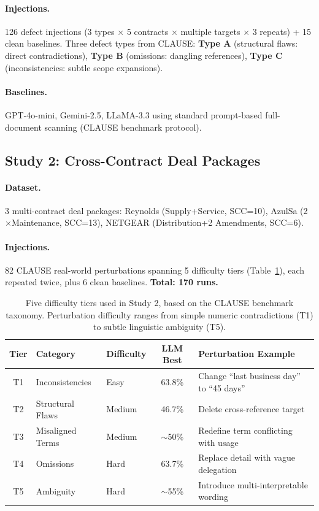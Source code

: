 \documentclass{article}
\begin{document}
\paragraph{Injections.} 126 defect injections (3 types $\times$ 5 contracts $\times$ multiple targets $\times$ 3 repeats) + 15 clean baselines. Three defect types from CLAUSE: \textbf{Type A} (structural flaws: direct contradictions), \textbf{Type B} (omissions: dangling references), \textbf{Type C} (inconsistencies: subtle scope expansions).

\paragraph{Baselines.} GPT-4o-mini, Gemini-2.5, LLaMA-3.3 using standard prompt-based full-document scanning (CLAUSE benchmark protocol).

\subsection{Study 2: Cross-Contract Deal Packages}

\paragraph{Dataset.} 3 multi-contract deal packages: Reynolds (Supply+Service, SCC=10), AzulSa (2$\times$Maintenance, SCC=13), NETGEAR (Distribution+2 Amendments, SCC=6).

\paragraph{Injections.} 82 CLAUSE real-world perturbations spanning 5 difficulty tiers (Table~\ref{tab:tiers}), each repeated twice, plus 6 clean baselines. \textbf{Total: 170 runs.}

\begin{table}[t]
\caption{Five difficulty tiers used in Study 2, based on the CLAUSE benchmark taxonomy. Perturbation difficulty ranges from simple numeric contradictions (T1) to subtle linguistic ambiguity (T5).}
\label{tab:tiers}
\centering
\small
\begin{tabular}{cllcl}
\toprule
\textbf{Tier} & \textbf{Category} & \textbf{Difficulty} & \textbf{LLM Best} & \textbf{Perturbation Example} \\
\midrule
T1 & Inconsistencies & Easy & 63.8\% & Change ``last business day'' to ``45 days'' \\
T2 & Structural Flaws & Medium & 46.7\% & Delete cross-reference target \\
T3 & Misaligned Terms & Medium & $\sim$50\% & Redefine term conflicting with usage \\
T4 & Omissions & Hard & 63.7\% & Replace detail with vague delegation \\
T5 & Ambiguity & Hard & $\sim$55\% & Introduce multi-interpretable wording \\
\bottomrule
\end{tabular}
\end{table}
\end{document}
